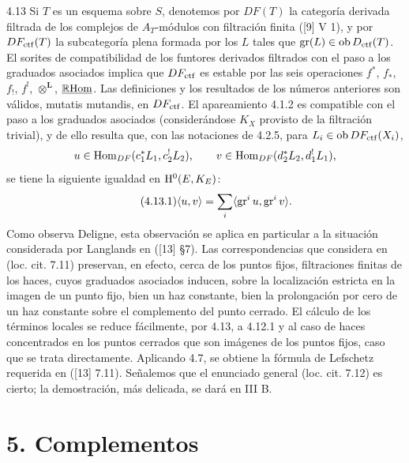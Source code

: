 \begin{statement}{4.13}
Si $T$ es un esquema sobre $S$, denotemos por $DF(T)$ la categoría derivada filtrada de los complejos de $A_T$-módulos con filtración finita ([9] V 1), y por $DF_{\mathrm{ctf}}(T)$ la subcategoría plena formada por los $L$ tales que $\operatorname{gr}(L)\in\operatorname{ob}D_{\mathrm{ctf}}(T)$. El sorites de compatibilidad de los funtores derivados filtrados con el paso a los graduados asociados implica que $DF_{\mathrm{ctf}}$ es estable por las seis operaciones $f^*$, $f_*$, $f_!$, $f^!$, $\otimes^{\mathbf L}$, $\underline{\mathbb{R}\mathrm{Hom}}$. Las definiciones y los resultados de los números anteriores son válidos, mutatis mutandis, en $DF_{\mathrm{ctf}}$. El apareamiento 4.1.2 es compatible con el paso a los graduados asociados (considerándose $K_X$ provisto de la filtración trivial), y de ello resulta que, con las notaciones de 4.2.5, para $L_i\in\operatorname{ob} DF_{\mathrm{ctf}}(X_i)$,
\[
u\in\operatorname{Hom}_{DF}(c_1^*L_1,c_2^!L_2),\qquad
v\in\operatorname{Hom}_{DF}(d_2^*L_2,d_1^!L_1),
\]
se tiene la siguiente igualdad en $\mathrm{H}^0(E,K_E)$:
\begin{equation}
\tag{4.13.1}
\langle u,v\rangle=\sum_i\langle \operatorname{gr}^i u,\operatorname{gr}^i v\rangle.
\end{equation}
Como observa Deligne, esta observación se aplica en particular a la situación considerada por Langlands en ([13] §7). Las correspondencias que considera en (loc. cit. 7.11) preservan, en efecto, cerca de los puntos fijos, filtraciones finitas de los haces, cuyos graduados asociados inducen, sobre la localización estricta en la imagen de un punto fijo, bien un haz constante, bien la prolongación por cero de un haz constante sobre el complemento del punto cerrado. El cálculo de los términos locales se reduce fácilmente, por 4.13, a 4.12.1 y al caso de haces concentrados en los puntos cerrados que son imágenes de los puntos fijos, caso que se trata directamente. Aplicando 4.7, se obtiene la fórmula de Lefschetz requerida en ([13] 7.11). Señalemos que el enunciado general (loc. cit. 7.12) es cierto; la demostración, más delicada, se dará en III B.
\end{statement}



\section*{5. Complementos}
